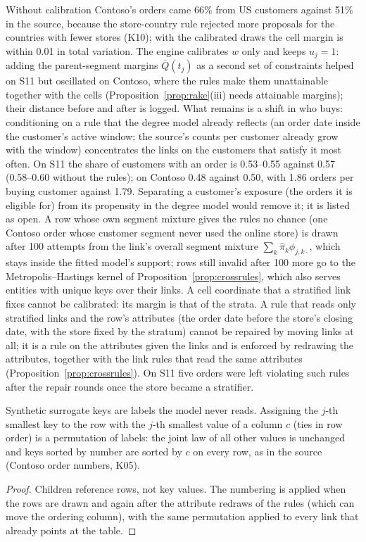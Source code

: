 \noindent Without calibration Contoso's orders came 66\% from US customers against 51\% in the source, because the store-country rule rejected more proposals for the countries with fewer stores (K10); with the calibrated draws the cell margin is within 0.01 in total variation. The engine calibrates $w$ only and keeps $u_j=1$: adding the parent-segment margins $\bar Q(t_j)$ as a second set of constraints helped on S11 but oscillated on Contoso, where the rules make them unattainable together with the cells (Proposition~\ref{prop:rake}(iii) needs attainable margins); their distance before and after is logged. What remains is a shift in who buys: conditioning on a rule that the degree model already reflects (an order date inside the customer's active window; the source's counts per customer already grow with the window) concentrates the links on the customers that satisfy it most often. On S11 the share of customers with an order is 0.53--0.55 against 0.57 (0.58--0.60 without the rules); on Contoso 0.48 against 0.50, with 1.86 orders per buying customer against 1.79. Separating a customer's exposure (the orders it is eligible for) from its propensity in the degree model would remove it; it is listed as open. A row whose own segment mixture gives the rules no chance (one Contoso order whose customer segment never used the online store) is drawn after 100 attempts from the link's overall segment mixture $\sum_k\hat\pi_k\phi_{j,k\cdot}$, which stays inside the fitted model's support; rows still invalid after 100 more go to the Metropolis--Hastings kernel of Proposition~\ref{prop:crossrules}, which also serves entities with unique keys over their links. A cell coordinate that a stratified link fixes cannot be calibrated: its margin is that of the strata. A rule that reads only stratified links and the row's attributes (the order date before the store's closing date, with the store fixed by the stratum) cannot be repaired by moving links at all; it is a rule on the attributes given the links and is enforced by redrawing the attributes, together with the link rules that read the same attributes (Proposition~\ref{prop:crossrules}). On S11 five orders were left violating such rules after the repair rounds once the store became a stratifier.

\begin{proposition}\label{prop:keyorder}
Synthetic surrogate keys are labels the model never reads. Assigning the $j$-th smallest key to the row with the $j$-th smallest value of a column $c$ (ties in row order) is a permutation of labels: the joint law of all other values is unchanged and keys sorted by number are sorted by $c$ on every row, as in the source (Contoso order numbers, K05).
\end{proposition}
\begin{proof}
Children reference rows, not key values. The numbering is applied when the rows are drawn and again after the attribute redraws of the rules (which can move the ordering column), with the same permutation applied to every link that already points at the table.
\end{proof}

